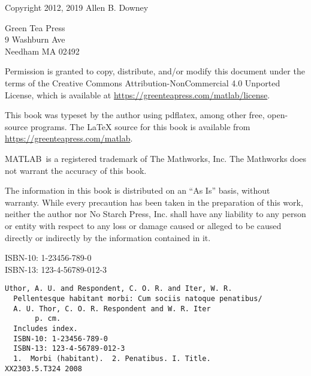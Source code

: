 
\maketitle

\vspace{2in}

\begin{center}
 {\Large \thetitle}

\vspace{0.25in}

Copyright 2012, 2019 Allen B. Downey
\end{center}

\vspace{0.25in}

\begin{flushleft}
Green Tea Press       \\
9 Washburn Ave \\
Needham MA 02492
\end{flushleft}

Permission is granted to copy, distribute, and/or modify this document under the terms of the Creative Commons Attribution-NonCommercial 4.0 Unported License, which is available at \url{https://greenteapress.com/matlab/license}.

This book was typeset by the author using pdflatex, among other free, open-source programs.
 The LaTeX source for this book is available from \url{https://greenteapress.com/matlab}.

MATLAB\myreg\ is a registered trademark of The Mathworks, Inc.  The Mathworks does not warrant the accuracy  of this book.

The information in this book is distributed on an ``As Is'' basis,
without warranty. While every precaution has been taken in the
preparation of this work, neither the author nor No Starch Press, Inc.
shall have any liability to any person or entity with respect to any
loss or damage caused or alleged to be caused directly or indirectly
by the information contained in it.


ISBN-10: 1-23456-789-0\\
ISBN-13: 123-4-56789-012-3


\begin{verbatim}
Uthor, A. U. and Respondent, C. O. R. and Iter, W. R.
  Pellentesque habitant morbi: Cum sociis natoque penatibus/
  A. U. Thor, C. O. R. Respondent and W. R. Iter
       p. cm.
  Includes index.
  ISBN-10: 1-23456-789-0
  ISBN-13: 123-4-56789-012-3
  1.  Morbi (habitant).  2. Penatibus. I. Title.
XX2303.5.T324 2008
\end{verbatim}





